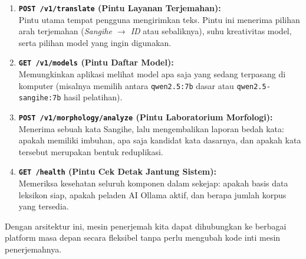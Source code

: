 \begin{enumerate}
    \item \textbf{\texttt{POST /v1/translate} (Pintu Layanan Terjemahan):} \\
    Pintu utama tempat pengguna mengirimkan teks. Pintu ini menerima pilihan arah terjemahan (\textit{Sangihe $\rightarrow$ ID} atau sebaliknya), suhu kreativitas model, serta pilihan model yang ingin digunakan.
    \item \textbf{\texttt{GET /v1/models} (Pintu Daftar Model):} \\
    Memungkinkan aplikasi melihat model apa saja yang sedang terpasang di komputer (misalnya memilih antara \texttt{qwen2.5:7b} dasar atau \texttt{qwen2.5-sangihe:7b} hasil pelatihan).
    \item \textbf{\texttt{POST /v1/morphology/analyze} (Pintu Laboratorium Morfologi):} \\
    Menerima sebuah kata Sangihe, lalu mengembalikan laporan bedah kata: apakah memiliki imbuhan, apa saja kandidat kata dasarnya, dan apakah kata tersebut merupakan bentuk reduplikasi.
    \item \textbf{\texttt{GET /health} (Pintu Cek Detak Jantung Sistem):} \\
    Memeriksa kesehatan seluruh komponen dalam sekejap: apakah basis data leksikon siap, apakah peladen AI Ollama aktif, dan berapa jumlah korpus yang tersedia.
\end{enumerate}

Dengan arsitektur ini, mesin penerjemah kita dapat dihubungkan ke berbagai platform masa depan secara fleksibel tanpa perlu mengubah kode inti mesin penerjemahnya.
